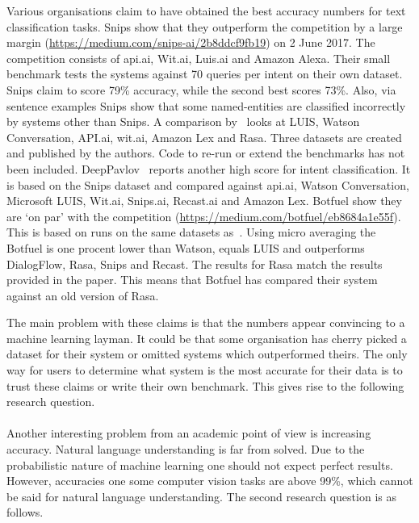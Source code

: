 Various organisations claim to have obtained the best accuracy numbers for text classification tasks.
Snips show that they outperform the competition by a large margin (\url{https://medium.com/snips-ai/2b8ddcf9fb19}) on 2 June 2017.
The competition consists of api.ai, Wit.ai, Luis.ai and Amazon Alexa.
Their small benchmark tests the systems against 70 queries per intent on their own dataset.
Snips claim to score 79\% accuracy, while the second best scores 73\%.
Also, via sentence examples Snips show that some named-entities are classified incorrectly by systems other than Snips.
A comparison by~\citet{braun2017} looks at LUIS, Watson Conversation, API.ai, wit.ai, Amazon Lex and Rasa.
Three datasets are created and published by the authors.
Code to re-run or extend the benchmarks has not been included.
DeepPavlov~\citep{burtsev2018} reports another high score for intent classification.
It is based on the Snips dataset and compared against api.ai, Watson Conversation, Microsoft LUIS, Wit.ai, Snips.ai, Recast.ai and Amazon Lex.
Botfuel show they are `on par' with the competition (\url{https://medium.com/botfuel/eb8684a1e55f}).
This is based on runs on the same datasets as~\citet{braun2017}.
Using micro averaging the Botfuel is one procent lower than Watson, equals LUIS and outperforms DialogFlow, Rasa, Snips and Recast.
The results for Rasa match the results provided in the paper.
This means that Botfuel has compared their system against an old version of Rasa.

The main problem with these claims is that the numbers appear convincing to a machine learning layman.
It could be that some organisation has cherry picked a dataset for their system or omitted systems which outperformed theirs.
The only way for users to determine what system is the most accurate for their data is to trust these claims or write their own benchmark.
This gives rise to the following research question.\\

\rqone \\[1mm]

Another interesting problem from an academic point of view is increasing accuracy.
Natural language understanding is far from solved.
Due to the probabilistic nature of machine learning one should not expect perfect results.
However, accuracies one some computer vision tasks are above 99\%, which cannot be said for natural language understanding.
The second research question is as follows.\\

